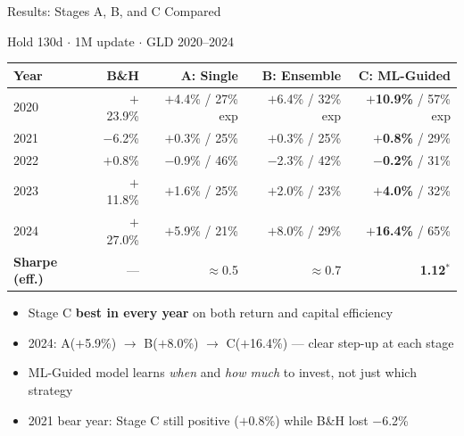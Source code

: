 \documentclass[aspectratio=169]{beamer}
\begin{document}
\begin{frame}{Results: Stages A, B, and C Compared}

  \small
  Hold 130d $\cdot$ 1M update $\cdot$ GLD 2020--2024 

  \vspace{0.3em}
  \begin{tabular}{lrrrr}
    \toprule
    Year & B\&H & \textbf{A}: Single & \textbf{B}: Ensemble & \textbf{C}: ML-Guided \\
    \midrule
    2020 & $+$23.9\% & $+$4.4\% / 27\% exp & $+$6.4\% / 32\% exp & \textbf{$+$10.9\%} / 57\% exp \\
    2021 & $-$6.2\%  & $+$0.3\% / 25\%     & $+$0.3\% / 25\%     & \textbf{$+$0.8\%}  / 29\% \\
    2022 & $+$0.8\%  & $-$0.9\% / 46\%     & $-$2.3\% / 42\%     & \textbf{$-$0.2\%}  / 31\% \\
    2023 & $+$11.8\% & $+$1.6\% / 25\%     & $+$2.0\% / 23\%     & \textbf{$+$4.0\%}  / 32\% \\
    2024 & $+$27.0\% & $+$5.9\% / 21\%     & $+$8.0\% / 29\%     & \textbf{$+$16.4\%} / 65\% \\
    \midrule
    \textbf{Sharpe (eff.)} & --- & $\approx$0.5 & $\approx$0.7 & \textbf{1.12}$^*$ \\
    \bottomrule
  \end{tabular}

  \vspace{0.4em}
  \begin{itemize}
    \item Stage C \textbf{best in every year} on both return and capital efficiency
    \item 2024: A($+$5.9\%) $\to$ B($+$8.0\%) $\to$ C($+$16.4\%) --- clear step-up at each stage
    \item ML-Guided model learns \emph{when} and \emph{how much} to invest, not just which strategy
    \item 2021 bear year: Stage C still positive ($+$0.8\%) while B\&H lost $-$6.2\%
  \end{itemize}

\end{frame}
\end{document}
